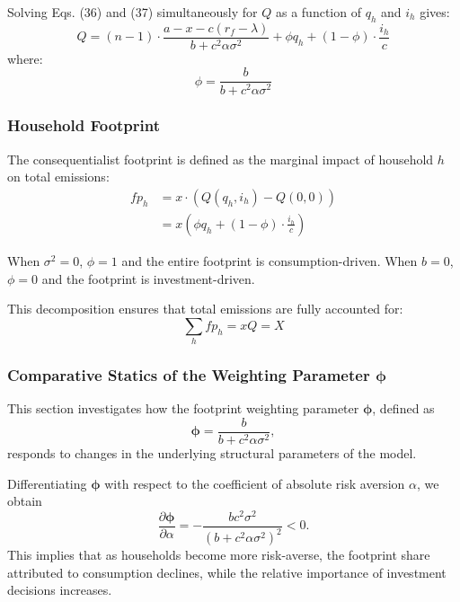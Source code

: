 \documentclass[12pt,a4paper]{article}%
\begin{document}
Solving Eqs. (36) and (37) simultaneously for $Q$ as a function of $q_h$ and $i_h$ gives:
\begin{equation}
Q = (n - 1) \cdot \frac{a - x - c(r_f - \lambda)}{b + c^2 \alpha \sigma^2} + \phi q_h + (1 - \phi) \cdot \frac{i_h}{c} 
\end{equation}
where:
\begin{equation}
\phi = \frac{b}{b + c^2 \alpha \sigma^2} 
\end{equation}

\subsubsection{Household Footprint}

The consequentialist footprint is defined as the marginal impact of household $h$ on total emissions:
\begin{align}
fp_h &= x \cdot (Q(q_h, i_h) - Q(0, 0)) \\
&= x \left( \phi q_h + (1 - \phi) \cdot \frac{i_h}{c} \right) 
\end{align}

When $\sigma^2 = 0$, $\phi = 1$ and the entire footprint is consumption-driven. When $b = 0$, $\phi = 0$ and the footprint is investment-driven.

This decomposition ensures that total emissions are fully accounted for:
\begin{equation}
\sum_h fp_h = xQ = X 
\end{equation}

\subsubsection{Comparative Statics of the Weighting Parameter \( \boldsymbol{\phi} \)}

This section investigates how the footprint weighting parameter \( \boldsymbol{\phi} \), defined as
\[
\boldsymbol{\phi} = \frac{b}{b + c^2 \alpha \sigma^2},
\]
responds to changes in the underlying structural parameters of the model.

Differentiating \( \boldsymbol{\phi} \) with respect to the coefficient of absolute risk aversion \( \alpha \), we obtain
\[
\frac{\partial \boldsymbol{\phi}}{\partial \alpha} = -\frac{b c^2 \sigma^2}{{(b + c^2 \alpha \sigma^2)}^2} < 0.
\]
This implies that as households become more risk-averse, the footprint share attributed to consumption declines, while the relative importance of investment decisions increases.
\end{document}
